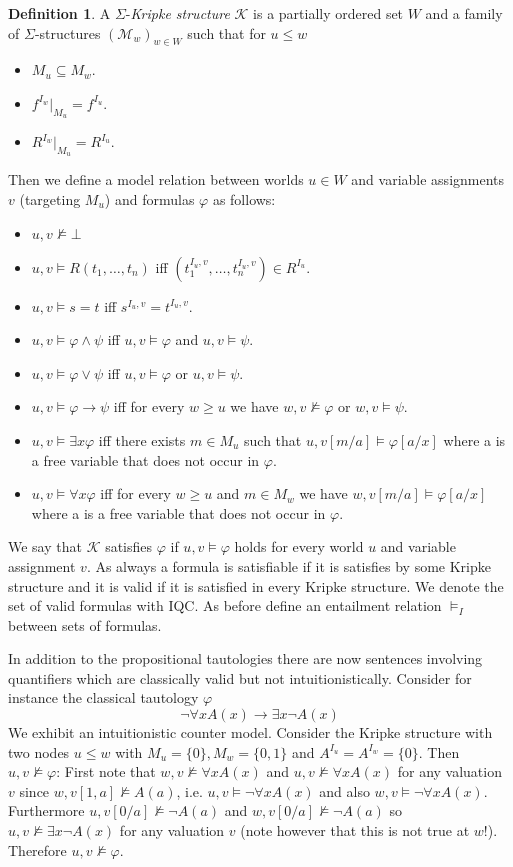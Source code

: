 \documentclass[a4paper,12pt]{report}
\theoremstyle{definition}
\theoremstyle{definition}
\theoremstyle{definition}
\theoremstyle{definition}
\theoremstyle{definition}
\newtheorem{definition}[theorem]{Definition}
\theoremstyle{definition}
\theoremstyle{definition}
\begin{document}
	\begin{definition}
		A $\Sigma$-\textit{Kripke structure} $\mathcal{K}$ is a partially ordered set $W$ and a family of $\Sigma$-structures $(\mathcal{M}_w)_{w\in W}$ such that for $u\leq w$
		\begin{itemize}
			\item $M_u\subseteq M_w$.
			\item $f^{I_w}|_{M_u} = f^{I_u}$.
			\item $R^{I_w}|_{M_u} = R^{I_u}$.
		\end{itemize}
		Then we define a model relation between worlds $u\in W$ and variable assignments $v$ (targeting $M_u$) and formulas $\varphi$ as follows:
		\begin{itemize}
			\item $u, v\not\models\bot$
			\item $u, v\models R(t_1,\dots,t_n)$ iff $(t_1^{I_u, v},\dots,t_n^{I_u, v})\in R^{I_u}$.
			\item $u, v\models s = t$ iff $s^{I_u, v} = t^{I_u, v}$.
			\item $u, v\models \varphi\wedge \psi$ iff $u, v\models\varphi$ and $u, v\models\psi$.
			\item $u, v\models \varphi\vee\psi$ iff $u, v\models\varphi$ or $u, v\models\psi$.
			\item $u, v\models \varphi\to\psi$ iff for every $w\geq u$ we have $w, v\not\models\varphi$ or $w, v\models\psi$.
			\item $u, v\models\exists x\varphi$ iff there exists $m\in M_u$ such that $u, v[m/a]\models\varphi[a/x]$ where a is a free variable that does not occur in $\varphi$.
			\item $u, v\models\forall x\varphi$ iff for every $w\geq u$ and $m\in M_w$ we have $w, v[m/a]\models\varphi[a/x]$ where a is a free variable that does not occur in $\varphi$.
		\end{itemize}
		We say that $\mathcal{K}$ satisfies $\varphi$ if $u, v\models\varphi$ holds for every world $u$ and variable assignment $v$. As always a formula is satisfiable if it is satisfies by some Kripke structure and it is valid if it is satisfied in every Kripke structure. We denote the set of valid formulas with IQC.  As before define an entailment relation $\models_I$ between sets of formulas.
	\end{definition}
	In addition to the propositional tautologies there are now sentences involving quantifiers which are classically valid but not intuitionistically.
	Consider for instance the classical tautology $\varphi$ $$\neg\forall x A(x)\to \exists x \neg A(x)$$We exhibit an intuitionistic counter model. Consider the Kripke structure with two nodes $u\leq w$ with $M_u = \{0\}, M_w = \{0, 1\}$ and $A^{I_u} = A^{I_w} = \{0\}$. Then $u, v\not\models \varphi$: First note that $w, v\not\models\forall xA(x)$ and $u, v\not\models\forall xA(x)$ for any valuation $v$ since $w, v[1, a]\not\models A(a)$, i.e. $u, v\models\neg\forall xA(x)$ and also $w, v\models\neg\forall xA(x)$. Furthermore $u, v[0/a]\not\models \neg A(a)$ and $w, v[0/a]\not\models \neg A(a)$ so $u, v\not\models \exists x\neg A(x)$ for any valuation $v$ (note however that this is not true at $w$!). Therefore $u, v\not\models\varphi$.
	
\end{document}
